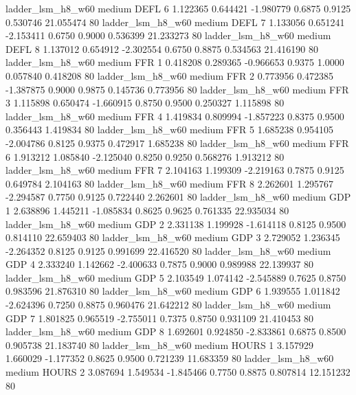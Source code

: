      ladder_lsm_h8_w60     medium     DEFL                 6  1.122365 0.644421 -1.980779 0.6875 0.9125  0.530746   21.055474 80
     ladder_lsm_h8_w60     medium     DEFL                 7  1.133056 0.651241 -2.153411 0.6750 0.9000  0.536399   21.233273 80
     ladder_lsm_h8_w60     medium     DEFL                 8  1.137012 0.654912 -2.302554 0.6750 0.8875  0.534563   21.416190 80
     ladder_lsm_h8_w60     medium      FFR                 1  0.418208 0.289365 -0.966653 0.9375 1.0000  0.057840    0.418208 80
     ladder_lsm_h8_w60     medium      FFR                 2  0.773956 0.472385 -1.387875 0.9000 0.9875  0.145736    0.773956 80
     ladder_lsm_h8_w60     medium      FFR                 3  1.115898 0.650474 -1.660915 0.8750 0.9500  0.250327    1.115898 80
     ladder_lsm_h8_w60     medium      FFR                 4  1.419834 0.809994 -1.857223 0.8375 0.9500  0.356443    1.419834 80
     ladder_lsm_h8_w60     medium      FFR                 5  1.685238 0.954105 -2.004786 0.8125 0.9375  0.472917    1.685238 80
     ladder_lsm_h8_w60     medium      FFR                 6  1.913212 1.085840 -2.125040 0.8250 0.9250  0.568276    1.913212 80
     ladder_lsm_h8_w60     medium      FFR                 7  2.104163 1.199309 -2.219163 0.7875 0.9125  0.649784    2.104163 80
     ladder_lsm_h8_w60     medium      FFR                 8  2.262601 1.295767 -2.294587 0.7750 0.9125  0.722440    2.262601 80
     ladder_lsm_h8_w60     medium      GDP                 1  2.638896 1.445211 -1.085834 0.8625 0.9625  0.761335   22.935034 80
     ladder_lsm_h8_w60     medium      GDP                 2  2.331138 1.199928 -1.614118 0.8125 0.9500  0.814110   22.659403 80
     ladder_lsm_h8_w60     medium      GDP                 3  2.729052 1.236345 -2.264352 0.8125 0.9125  0.991699   22.416520 80
     ladder_lsm_h8_w60     medium      GDP                 4  2.333240 1.142662 -2.400633 0.7875 0.9000  0.989988   22.139937 80
     ladder_lsm_h8_w60     medium      GDP                 5  2.103549 1.074142 -2.545889 0.7625 0.8750  0.983596   21.876310 80
     ladder_lsm_h8_w60     medium      GDP                 6  1.939555 1.011842 -2.624396 0.7250 0.8875  0.960476   21.642212 80
     ladder_lsm_h8_w60     medium      GDP                 7  1.801825 0.965519 -2.755011 0.7375 0.8750  0.931109   21.410453 80
     ladder_lsm_h8_w60     medium      GDP                 8  1.692601 0.924850 -2.833861 0.6875 0.8500  0.905738   21.183740 80
     ladder_lsm_h8_w60     medium    HOURS                 1  3.157929 1.660029 -1.177352 0.8625 0.9500  0.721239   11.683359 80
     ladder_lsm_h8_w60     medium    HOURS                 2  3.087694 1.549534 -1.845466 0.7750 0.8875  0.807814   12.151232 80
